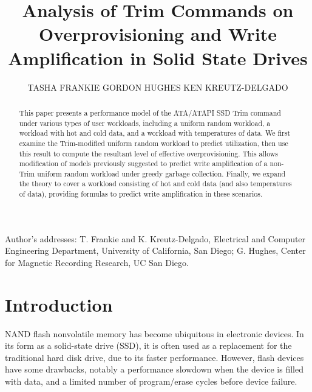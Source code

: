\documentclass[prodmode,acmtos]{acmsmall}
\begin{document}

\title{Analysis of Trim Commands on Overprovisioning and Write Amplification in Solid State Drives}
\author{TASHA FRANKIE
GORDON HUGHES
KEN KREUTZ-DELGADO
}

\begin{abstract}
This paper presents a performance model of the ATA/ATAPI SSD Trim command under various types of user workloads, including a uniform random workload, a workload with hot and cold data, and a workload with  temperatures of data. We first examine the Trim-modified uniform random workload to predict utilization, then use this result to compute the resultant level of effective overprovisioning. This allows modification of models previously suggested to predict write amplification of a non-Trim uniform random workload under greedy garbage collection.  Finally, we expand the theory to cover a workload consisting of hot and cold data (and also  temperatures of data), providing formulas to predict write amplification in these scenarios.
\end{abstract}







\begin{bottomstuff}

Author's addresses: T. Frankie {and} K. Kreutz-Delgado, Electrical and Computer Engineering Department, University of California, San Diego; G. Hughes, Center for Magnetic Recording Research, UC San Diego.
\end{bottomstuff}

\maketitle


\section{Introduction}
NAND flash nonvolatile memory has become ubiquitous in electronic devices.  In its form as a solid-state drive (SSD), it is often used as a replacement for the traditional hard disk drive, due to its faster performance.  However, flash devices have some drawbacks, notably a performance slowdown when the device is filled with data, and a limited number of program/erase cycles before device failure.
\end{document}
